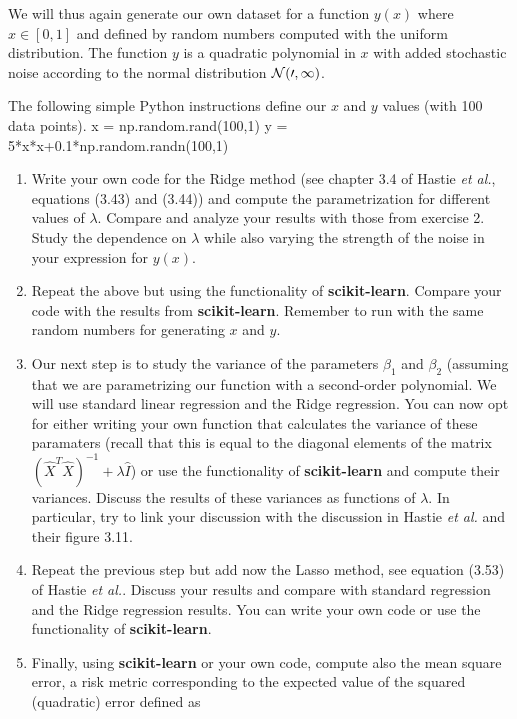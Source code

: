 \documentclass[%
oneside,                 %
final,                   %
10pt]{article}
\begin{document}
We will thus again generate our own dataset for a function $y(x)$ where 
$x \in [0,1]$ and defined by random numbers computed with the uniform
distribution. The function $y$ is a quadratic polynomial in $x$ with
added stochastic noise according to the normal distribution $\cal{N}(0,1)$.

The following simple Python instructions define our $x$ and $y$ values (with 100 data points).
\bpycod
x = np.random.rand(100,1)
y = 5*x*x+0.1*np.random.randn(100,1)
\epycod

\begin{enumerate}
\item Write your own code for the Ridge method (see chapter 3.4 of Hastie \emph{et al.}, equations (3.43) and (3.44)) and compute the parametrization for different values of $\lambda$. Compare and analyze your results with those from exercise 2. Study the dependence on $\lambda$ while also varying the strength of the noise in your expression for $y(x)$. 

\item Repeat the above but using the functionality of \textbf{scikit-learn}. Compare your code with the results from \textbf{scikit-learn}. Remember to run with the same random numbers for generating $x$ and $y$. 

\item Our next step is to study the variance of the parameters $\beta_1$ and $\beta_2$ (assuming that we are parametrizing our function with a second-order polynomial. We will use standard linear regression and the Ridge regression.  You can now opt for either writing your own function that calculates the variance of these paramaters (recall that this is equal to the diagonal elements of the matrix $(\hat{X}^T\hat{X})^{-1}+\lambda\hat{I}$) or use the functionality of \textbf{scikit-learn} and compute their variances. Discuss the results of these variances as functions of $\lambda$. In particular, try to link your discussion with the discussion in Hastie \emph{et al.} and their figure 3.11.

\item Repeat the previous step but add now the Lasso method, see equation (3.53) of Hastie \emph{et al.}. Discuss your results and compare with standard regression and the Ridge regression results. You can write your own code or use the functionality of \textbf{scikit-learn}.  

\item Finally, using \textbf{scikit-learn} or your own code, compute also the mean square error, a risk metric corresponding to the expected value of the squared (quadratic) error defined as
\end{enumerate}
\end{document}
